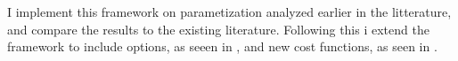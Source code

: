 \documentclass[11pt]{article}
\begin{document}

I implement this framework on parametization analyzed earlier in the litterature, and compare the results to the existing literature.
Following this i extend the framework to include options, as seeen in \textcite{CaiJuddXu2020},
and new cost functions, as seen in \textcite{Dybvig2020}.


\ifdefined\COMPILINGMAIN
\else
\printbibliography
\end{document}
